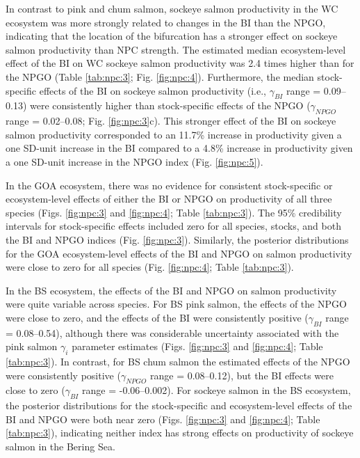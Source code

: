 In contrast to pink and chum salmon, sockeye salmon productivity in the WC
ecosystem was more strongly related to changes in the BI than the NPGO,
indicating that the location of the bifurcation has a stronger effect on sockeye
salmon productivity than NPC strength. The estimated median ecosystem-level
effect of the BI on WC sockeye salmon productivity was 2.4 times higher than for
the NPGO (Table \ref{tab:npc:3}; Fig. \ref{fig:npc:4}). Furthermore, the median
stock-specific effects of the BI on sockeye salmon productivity (i.e.,
\(\gamma_{BI}\) range = 0.09--0.13) were consistently higher than stock-specific
effects of the NPGO (\(\gamma_{NPGO}\) range = 0.02--0.08; Fig.
\ref{fig:npc:3}c). This stronger effect of the BI on sockeye salmon productivity
corresponded to an 11.7\% increase in productivity given a one SD-unit increase
in the BI compared to a 4.8\% increase in productivity given a one SD-unit
increase in the NPGO index (Fig. \ref{fig:npc:5}).

In the GOA ecosystem, there was no evidence for consistent stock-specific or
ecosystem-level effects of either the BI or NPGO on productivity of all three
species (Figs. \ref{fig:npc:3} and \ref{fig:npc:4}; Table \ref{tab:npc:3}). The
95\% credibility intervals for stock-specific effects included zero for all
species, stocks, and both the BI and NPGO indices (Fig. \ref{fig:npc:3}).
Similarly, the posterior distributions for the GOA ecosystem-level effects of
the BI and NPGO on salmon productivity were close to zero for all species (Fig.
\ref{fig:npc:4}; Table \ref{tab:npc:3}).

In the BS ecosystem, the effects of the BI and NPGO on salmon productivity were
quite variable across species. For BS pink salmon, the effects of the NPGO were
close to zero, and the effects of the BI were consistently positive
(\(\gamma_{BI}\) range = 0.08--0.54), although there was considerable
uncertainty associated with the pink salmon \(\gamma_i\) parameter estimates
(Figs. \ref{fig:npc:3} and \ref{fig:npc:4}; Table \ref{tab:npc:3}). In contrast,
for BS chum salmon the estimated effects of the NPGO were consistently positive
(\(\gamma_{NPGO}\) range = 0.08--0.12), but the BI effects were close to zero
(\(\gamma_{BI}\) range = -0.06--0.002). For sockeye salmon in the BS ecosystem,
the posterior distributions for the stock-specific and ecosystem-level effects
of the BI and NPGO were both near zero (Figs. \ref{fig:npc:3} and
\ref{fig:npc:4}; Table \ref{tab:npc:3}), indicating neither index has strong
effects on productivity of sockeye salmon in the Bering Sea.

